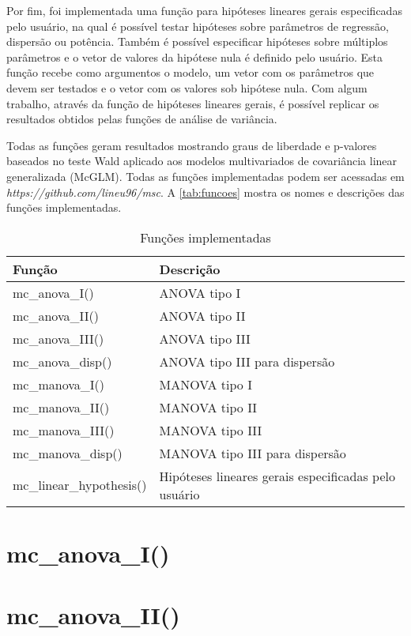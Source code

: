 Por fim, foi implementada uma função para hipóteses lineares gerais especificadas pelo usuário, na qual é possível testar hipóteses sobre parâmetros de regressão, dispersão ou potência. Também é possível especificar hipóteses sobre múltiplos parâmetros e o vetor de valores da hipótese nula é definido pelo usuário. Esta função recebe como argumentos o modelo, um vetor com os parâmetros que devem ser testados e o vetor com os valores sob hipótese nula. Com algum trabalho, através da função de hipóteses lineares gerais, é possível replicar os resultados obtidos pelas funções de análise de variância.

Todas as funções geram resultados mostrando graus de liberdade e p-valores baseados no teste Wald aplicado aos modelos multivariados de covariância linear generalizada (McGLM). Todas as funções implementadas podem ser acessadas em \emph{https://github.com/lineu96/msc}. A \autoref{tab:funcoes} mostra os nomes e descrições das funções implementadas.

\begin{table}[h]
\centering
\begin{tabular}{ll}
\hline
Função                   & Descrição \\ 
\hline
mc\_anova\_I()           & ANOVA  tipo I \\
mc\_anova\_II()          & ANOVA  tipo II \\
mc\_anova\_III()         & ANOVA  tipo III \\
mc\_anova\_disp()        & ANOVA  tipo III para dispersão \\
mc\_manova\_I()          & MANOVA tipo I \\
mc\_manova\_II()         & MANOVA tipo II \\
mc\_manova\_III()        & MANOVA tipo III \\
mc\_manova\_disp()       & MANOVA tipo III para dispersão \\
mc\_linear\_hypothesis() & Hipóteses lineares gerais especificadas pelo usuário \\ 
\hline
\end{tabular}
\caption{Funções implementadas}
\label{tab:funcoes}
\end{table}

\section{mc\_anova\_I()}

\section{mc\_anova\_II()}

